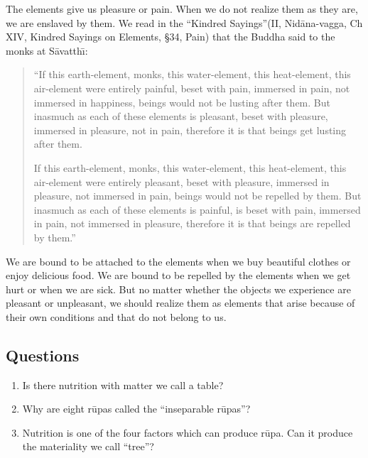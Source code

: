 \documentclass{book}
\begin{document}
The elements give us pleasure or pain. When we do not realize them as
they are, we are enslaved by them. We read in the ``Kindred
Sayings''(II, Nid{\=a}na-vagga, Ch XIV, Kindred Sayings on Elements,
{\S}34, Pain) that the Buddha said to the monks at S{\=a}vatth\=\i:




\begin{quote}\begin{flushleft}
``If this earth-element, monks, this water-element, this
heat-element, this air-element were entirely painful, beset with
pain, immersed in pain, not immersed in happiness, beings would not be
lusting after them. But inasmuch as each of these elements is pleasant,
beset with pleasure, immersed in pleasure, not in pain, therefore it is
that beings get lusting after them.

If this earth-element, monks, this water-element, this
heat-element, this air-element were entirely pleasant, beset with
pleasure, immersed in pleasure, not immersed in pain, beings would not
be repelled by them. But inasmuch as each of these elements is painful,
is beset with pain, immersed in pain, not immersed in pleasure,
therefore it is that beings are repelled by them.''


\end{flushleft}\end{quote}


We are bound to be attached to the elements when we buy beautiful
clothes or enjoy delicious food. We are bound to be repelled by the
elements when we get hurt or when we are sick. But no matter whether
the objects we experience are pleasant or unpleasant, we should realize
them as elements that arise because of their own conditions and that do
not belong to us.














\subsection*{Questions}


\begin{enumerate}
\item Is there nutrition with matter we call a table?

\item Why are eight r\=upas called the ``inseparable r\=upas''?

\item Nutrition is one of the four factors which can produce r\=upa. Can it produce the materiality we call ``tree''?
\end{enumerate}
\end{document}

